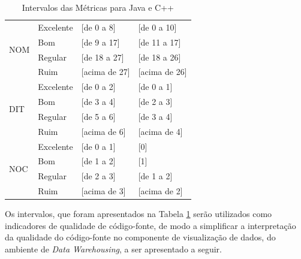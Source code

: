 \begin{table}[!ht]
\begin{center}
\begin{tabular}{ |l|l|l|l| }
		\multirow{4}{*}{NOM} 
		 & Excelente & [de 0 a 8] & [de 0 a 10] \\
		 & Bom & [de 9 a 17] & [de 11 a 17] \\
		 & Regular & [de 18 a 27] & [de 18 a 26] \\
		 & Ruim & [acima de 27] & [acima de 26] \\ \hline
		 
		\multirow{4}{*}{DIT} 
		 & Excelente & [de 0 a 2] & [de 0 a 1] \\
		 & Bom & [de 3 a 4] & [de 2 a 3] \\
		 & Regular & [de 5 a 6] & [de 3 a 4] \\
		 & Ruim & [acima de 6] & [acima de 4] \\ \hline
		
		\multirow{4}{*}{NOC} 
		 & Excelente & [de 0 a 1] & [0] \\
		 & Bom & [de 1 a 2] & [1] \\
		 & Regular & [de 2 a 3] & [de 1 a 2] \\
		 & Ruim & [acima de 3] & [acima de 2] \\ \hline
		 
	\end{tabular}
	\caption{Intervalos das Métricas para Java e C++}
	\label{metrics}
	\end{center}
	\end{table}

\FloatBarrier
	
Os intervalos, que foram apresentados na Tabela \ref{metrics} serão utilizados
como indicadores de qualidade de código-fonte, de modo a simplificar a 
interpretação da qualidade do código-fonte no componente de visualização de dados, do ambiente de \textit{Data Warehousing}, a ser apresentado a seguir.
